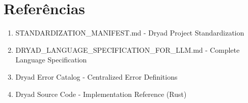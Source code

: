 \documentclass[12pt,a4paper]{article}
\theoremstyle{definition}
\begin{document}
\section*{Referências}

\begin{enumerate}
    \item STANDARDIZATION\_MANIFEST.md - Dryad Project Standardization
    \item DRYAD\_LANGUAGE\_SPECIFICATION\_FOR\_LLM.md - Complete Language Specification
    \item Dryad Error Catalog - Centralized Error Definitions
    \item Dryad Source Code - Implementation Reference (Rust)
\end{enumerate}
\end{document}
